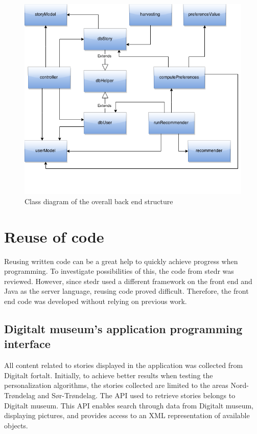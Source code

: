 \begin{figure}[h!]
	\centering
	\includegraphics[width=\textwidth]{fig/overall_backend}
	\caption{Class diagram of the overall back end structure}
	\label{Fig:overall_backend}
\end{figure}

\section{Reuse of code}

Reusing written code can be a great help to quickly achieve progress when programming.  To investigate possibilities of this, the code from stedr was reviewed. However, since stedr used a different framework on the front end and Java as the server language, reusing code proved difficult. Therefore, the front end code was developed without relying on previous work.

\subsection{Digitalt museum’s application programming interface}
\label{subsec:api}

All content related to stories displayed in the application was collected from Digitalt fortalt. Initially, to achieve better results when testing the personalization algorithms, the stories collected are limited to the areas Nord-Trøndelag and Sør-Trøndelag. The API \cite{digitaltMuseum} used to retrieve stories belongs to Digitalt museum. This API enables search through data from Digitalt museum, displaying pictures, and provides access to an XML representation of available objects.\newline

